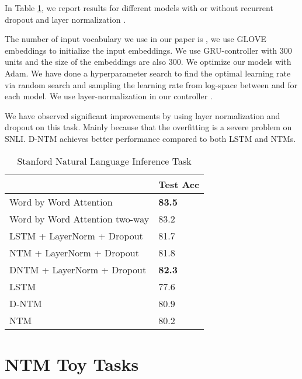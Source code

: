 \documentclass[12pt]{article}
\begin{document}
In Table \ref{tbl:snli_ntm_res}, we report results for different models with or without recurrent dropout \citep{semeniuta2016recurrent} and layer normalization \citep{ba2016layer}.

The number of input vocabulary we use in our paper is , we use GLOVE~\citep{pennington2014glove} embeddings to initialize the input embeddings. We use GRU-controller with 300 units and the size of the embeddings are also 300. We optimize our models with Adam. We have done a hyperparameter search to find the optimal learning rate via random search and sampling the learning rate from log-space between  and  for each model. We use layer-normalization in our controller \citep{ba2016layer}. 

We have observed significant improvements by using layer normalization and dropout on this task. Mainly because that the overfitting is a severe problem on SNLI. D-NTM achieves better performance compared to both LSTM and NTMs.

\begin{table}[htbp]
\centering
\footnotesize
\begin{tabular}{@{}ll@{}}
\toprule
                                                    & Test  Acc \\ \midrule
                                                                \hline
            Word by Word Attention\citep{rocktaschel2015reasoning} & \textbf{83.5} \\
            Word by Word Attention two-way\citep{rocktaschel2015reasoning} & 83.2 \\
            \hline
            LSTM + LayerNorm + Dropout & 81.7 \\
            NTM + LayerNorm + Dropout & 81.8 \\
            DNTM + LayerNorm + Dropout & \textbf{82.3} \\
            LSTM \citep{bowman2015large} & 77.6 \\
            D-NTM & 80.9 \\
            NTM & 80.2 \\ \bottomrule
\end{tabular}
\caption{ Stanford Natural Language Inference Task}
\label{tbl:snli_ntm_res}

\end{table}



\section{NTM Toy Tasks}
\end{document}
